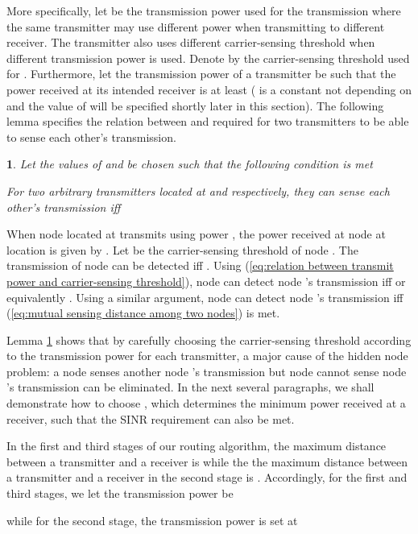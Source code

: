 \documentclass[english]{IEEEtran}
\theoremstyle{plain}
\theoremstyle{plain}
\theoremstyle{plain}
\newtheorem{lem}[thm]{\protect\lemmaname}
\theoremstyle{remark}
\providecommand{\lemmaname}{Lemma}
\begin{document}
More specifically, let  be the transmission power used for
the  transmission where the same transmitter may use different
power when transmitting to different receiver. The transmitter also
uses different carrier-sensing threshold when different transmission
power is used. Denote by  the carrier-sensing threshold used
for . Furthermore, let the transmission power of a transmitter
be such that the power received at its intended receiver is at least
 ( is a constant not depending on  and the
value of  will be specified shortly later in this section).
The following lemma specifies the relation between  and 
required for two transmitters to be able to sense each other's transmission.
\begin{lem}
\label{lem:mutually sense range}Let the values of  and 
be chosen such that the following condition is met 

For two arbitrary transmitters located at  and
 respectively, they can sense each other's transmission
iff 

\end{lem}
\begin{IEEEproof}
When node  located at  transmits using power
, the power received at node  at location 
is given by .
Let  be the carrier-sensing threshold of node . The transmission
of node  can be detected iff .
Using (\ref{eq:relation between transmit power and carrier-sensing threshold}),
node  can detect node 's transmission iff 
or equivalently .
Using a similar argument, node  can detect node 's transmission
iff (\ref{eq:mutual sensing distance among two nodes}) is met.
\end{IEEEproof}
Lemma \ref{lem:mutually sense range} shows that by carefully choosing
the carrier-sensing threshold according to the transmission power
for each transmitter, a major cause of the hidden node problem: a
node  senses another node 's transmission but node  cannot
sense node 's transmission can be eliminated. In the next several
paragraphs, we shall demonstrate how to choose , which determines
the minimum power received at a receiver, such that the SINR requirement
can also be met.

In the first and third stages of our routing algorithm, the maximum
distance between a transmitter and a receiver is 
while the the maximum distance between a transmitter and a receiver
in the second stage is . Accordingly, for the first and
third stages, we let the transmission power be

while for the second stage, the transmission power is set at 
\end{document}
